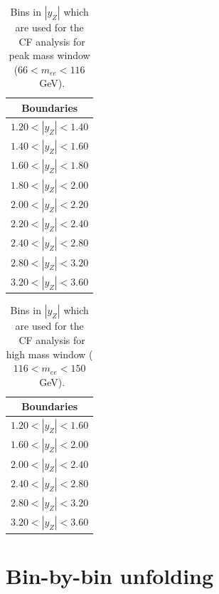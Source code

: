 \begin{table}
\centering
\begin{tabular}{c}
\hline\hline
Boundaries\\\hline
$1.20 < |y_{Z}| <1.40$\\
$1.40 < |y_{Z}| <1.60$\\
$1.60 < |y_{Z}| <1.80$\\
$1.80 < |y_{Z}| <2.00$\\
$2.00 < |y_{Z}| <2.20$\\
$2.20 < |y_{Z}| <2.40$\\
$2.40 < |y_{Z}| <2.80$\\
$2.80 < |y_{Z}| <3.20$\\
$3.20 < |y_{Z}| <3.60$\\
\hline\hline
\end{tabular}
\caption{Bins in $|y_{Z}|$ which are used for the \Zee\ CF analysis for peak mass window ($66 < m_{ee} < 116$~GeV).}
\label{tab:ZeeCS_bins_peak}
\end{table}

\begin{table}
\centering
\begin{tabular}{c}
\hline\hline
Boundaries\\\hline
$1.20 < |y_{Z}| <1.60$\\
$1.60 < |y_{Z}| <2.00$\\
$2.00 < |y_{Z}| <2.40$\\
$2.40 < |y_{Z}| <2.80$\\
$2.80 < |y_{Z}| <3.20$\\
$3.20 < |y_{Z}| <3.60$\\
\hline\hline
\end{tabular}
\caption{Bins in $|y_{Z}|$ which are used for the \Zee\ CF analysis for high mass window ($116 < m_{ee} < 150$~GeV).}
\label{tab:ZeeCS_bins_high}
\end{table}

\section{Bin-by-bin unfolding}

